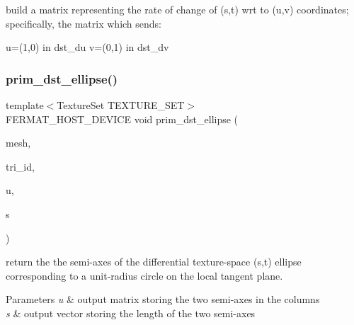 build a matrix representing the rate of change of (s,t) wrt to (u,v) coordinates; specifically, the matrix which sends\+:

u=(1,0) in dst\+\_\+du v=(0,1) in dst\+\_\+dv \mbox{\label{group___mesh_module_ga26c332905023bcaa1134263884b75d96}} 
\subsubsection{\texorpdfstring{prim\+\_\+dst\+\_\+ellipse()}{prim\_dst\_ellipse()}}
{\footnotesize\ttfamily template$<$Texture\+Set T\+E\+X\+T\+U\+R\+E\+\_\+\+S\+ET$>$ \\
F\+E\+R\+M\+A\+T\+\_\+\+H\+O\+S\+T\+\_\+\+D\+E\+V\+I\+CE void prim\+\_\+dst\+\_\+ellipse (\begin{DoxyParamCaption}\item[{const \hyperlink{struct_mesh_view}{Mesh\+View} \&}]{mesh,  }\item[{const uint32}]{tri\+\_\+id,  }\item[{\hyperlink{structcugar_1_1_matrix}{cugar\+::\+Matrix2x2f} \&}]{u,  }\item[{\hyperlink{structcugar_1_1_vector}{cugar\+::\+Vector2f} \&}]{s }\end{DoxyParamCaption})\hspace{0.3cm}{\ttfamily [inline]}}

return the the semi-\/axes of the differential texture-\/space (s,t) ellipse corresponding to a unit-\/radius circle on the local tangent plane.


\begin{DoxyParams}{Parameters}
{\em u} & output matrix storing the two semi-\/axes in the columns \\
\hline
{\em s} & output vector storing the length of the two semi-\/axes \\
\hline
\end{DoxyParams}
\mbox{\label{group___mesh_module_gadff3b3290f88aeb4dc6e3734c36d76bb}} 
